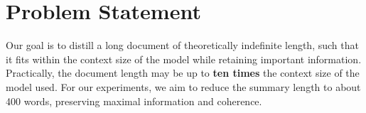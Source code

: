 \section{Problem Statement}
	\label{sec:problem}

	Our goal is to distill a long document of theoretically indefinite length, such that
	it fits within the context size of the model while retaining important information.
	Practically, the document length may be up to \textbf{ten times} the context size
	of the model used.
	For our experiments, we aim to reduce the summary length to about 400 words, preserving
	maximal information and coherence.
